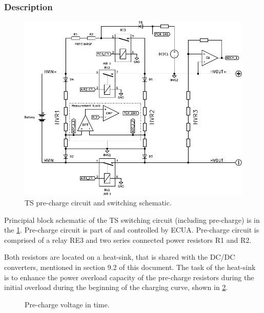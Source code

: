 \subsubsection{Description}

\begin{figure}[H]
	\centering
	\includegraphics[width=\textwidth,clip]{./img/ECUA_AIRS.pdf}
	\caption{TS pre-charge circuit and switching schematic.}
	\label{fig:precharge_sch}
\end{figure}

Principial block schematic of the TS switching circuit (including pre-charge) is in the \ref{fig:precharge_sch}. Pre-charge circuit is part of and controlled by ECUA. Pre-charge circuit is comprised of a relay RE3 and two series connected power resistors R1 and R2. 

Both resistors are located on a heat-sink, that is shared with the DC/DC converters, mentioned in section 9.2 of this document. The task of the heat-sink is to enhance the power overload capacity of the pre-charge resistors during the initial overload during the beginning of the charging curve, shown in \ref{fig:precharge_voltage_time}.

\begin{figure}
		\caption{Pre-charge voltage in time.}
	\label{fig:precharge_voltage_time}
\end{figure}


